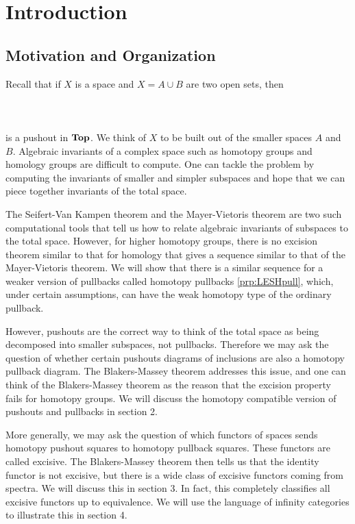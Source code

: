 \section{Introduction}
\subsection{Motivation and Organization}
Recall that if $X$ is a space and $X=A\cup B$ are two open sets, then \\~\\
 \\~\\
is a pushout in $\bold{Top}$. We think of $X$ to be built out of the smaller spaces $A$ and $B$. Algebraic invariants of a complex space such as homotopy groups and homology groups are difficult to compute. One can tackle the problem by computing the invariants of smaller and simpler subspaces and hope that we can piece together invariants of the total space. 

The Seifert-Van Kampen theorem and the Mayer-Vietoris theorem are two such computational tools that tell us how to relate algebraic invariants of subspaces to the total space. However, for higher homotopy groups, there is no excision theorem similar to that for homology that gives a sequence similar to that of the Mayer-Vietoris theorem. We will show that there is a similar sequence for a weaker version of pullbacks called homotopy pullbacks \ref{prp:LESHpull}, which, under certain assumptions, can have the weak homotopy type of the ordinary pullback. 

However, pushouts are the correct way to think of the total space as being decomposed into smaller subspaces, not pullbacks. Therefore we may ask the question of whether certain pushouts diagrams of inclusions are also a homotopy pullback diagram. The Blakers-Massey theorem addresses this issue, and one can think of the Blakers-Massey theorem as the reason that the excision property fails for homotopy groups. We will discuss the homotopy compatible version of pushouts and pullbacks in section 2. 

More generally, we may ask the question of which functors of spaces sends homotopy pushout squares to homotopy pullback squares. These functors are called excisive. The Blakers-Massey theorem then tells us that the identity functor is not excisive, but there is a wide class of excisive functors  coming from spectra. We will discuss this in section 3. In fact, this completely classifies all excisive functors up to equivalence. We will use the language of infinity categories to illustrate this in section 4. 

